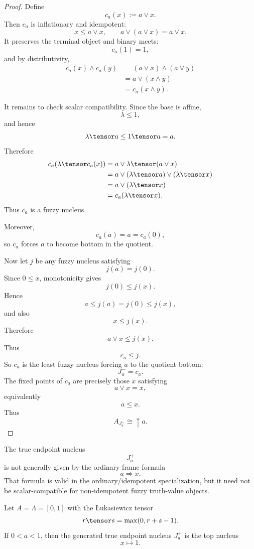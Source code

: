 \begin{proof}
Define
\[
    c_a(x):=a\vee x.
\]
Then \(c_a\) is inflationary and idempotent:
\[
    x\leq a\vee x,
    \qquad
    a\vee(a\vee x)=a\vee x.
\]
It preserves the terminal object and binary meets:
\[
    c_a(1)=1,
\]
and by distributivity,
\[
\begin{aligned}
    c_a(x)\wedge c_a(y)
    &=
    (a\vee x)\wedge(a\vee y)\\
    &=
    a\vee(x\wedge y)\\
    &=
    c_a(x\wedge y).
\end{aligned}
\]

It remains to check scalar compatibility.  Since the base is affine,
\[
    \lambda\leq 1,
\]
and hence
\[
    \lambda\tensor a\leq 1\tensor a=a.
\]
Therefore
\[
\begin{aligned}
    c_a(\lambda\tensor c_a(x))
    &=
    a\vee \lambda\tensor(a\vee x)\\
    &=
    a\vee(\lambda\tensor a)\vee(\lambda\tensor x)\\
    &=
    a\vee(\lambda\tensor x)\\
    &=
    c_a(\lambda\tensor x).
\end{aligned}
\]
Thus \(c_a\) is a fuzzy nucleus.

Moreover,
\[
    c_a(a)=a=c_a(0),
\]
so \(c_a\) forces \(a\) to become bottom in the quotient.

Now let \(j\) be any fuzzy nucleus satisfying
\[
    j(a)=j(0).
\]
Since \(0\leq x\), monotonicity gives
\[
    j(0)\leq j(x).
\]
Hence
\[
    a\leq j(a)=j(0)\leq j(x),
\]
and also
\[
    x\leq j(x).
\]
Therefore
\[
    a\vee x\leq j(x).
\]
Thus
\[
    c_a\leq j.
\]
So \(c_a\) is the least fuzzy nucleus forcing \(a\) to the quotient bottom:
\[
    J_a^-=c_a.
\]
The fixed points of \(c_a\) are precisely those \(x\) satisfying
\[
    a\vee x=x,
\]
equivalently
\[
    a\leq x.
\]
Thus
\[
    A_{J_a^-}\cong\uparrow a.
\]
\end{proof}

\begin{remark}[No general formula \(J_a^+(x)=a\Rightarrow x\)]
\label{rem:no-general-open-nucleus-formula}
The true endpoint nucleus
\[
    J_a^+
\]
is not generally given by the ordinary frame formula
\[
    a\Rightarrow x.
\]
That formula is valid in the ordinary/idempotent specialization, but it need
not be scalar-compatible for non-idempotent fuzzy truth-value objects.
\end{remark}

\begin{proposition}
\label{prop:non-idempotent-true-endpoint-collapse}
Let \(A=\Lambda=[0,1]\) with the Łukasiewicz tensor
\[
    r\tensor s=\max(0,r+s-1).
\]
If \(0<a<1\), then the generated true endpoint nucleus \(J_a^+\) is the top
nucleus
\[
    x\longmapsto 1.
\]
\end{proposition}

